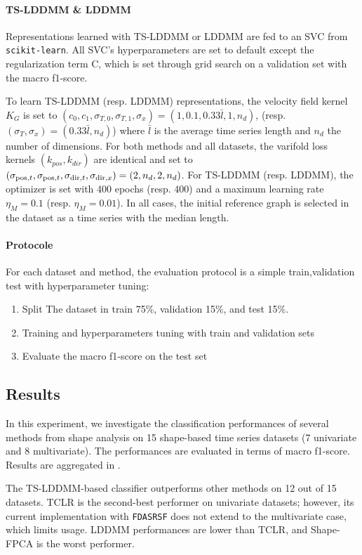 \paragraph{TS-LDDMM \& LDDMM}
Representations learned with TS-LDDMM or LDDMM are fed to an SVC from \texttt{scikit-learn}. All SVC's hyperparameters are set to default except the regularization term C, which is set through grid search on a validation set with the macro f1-score. 

To learn TS-LDDMM (resp. LDDMM) representations, the velocity field kernel $K_G$ is set to $ (c_0,c_1,\sigma_{T,0},\sigma_{T,1},\sigma_x) = (1,0.1,0.33\bar{l},1,n_d)$, (resp. $ (\sigma_{T},\sigma_x) = (0.33\bar{l},n_d)$) where $\bar{l}$ is the average time series length and $n_d$ the number of dimensions. For both methods and all datasets, the varifold loss kernels $(k_{pos},k_{dir})$ are identical and set to $(\sigma_{\mathrm{pos},t}, \sigma_{\mathrm{pos},t}, \sigma_{\mathrm{dir},t}, \sigma_{\mathrm{dir},x}) = (2,n_d,2,n_d)$. For TS-LDDMM (resp. LDDMM), the optimizer is set with 400 epochs (resp. 400) and a maximum learning rate $\eta_M = 0.1$ (resp. $\eta_M = 0.01$). In all cases, the initial reference graph is selected in the dataset as a time series with the median length.


\paragraph{Protocole}
For each dataset and method, the evaluation protocol is a simple train,validation test with hyperparameter tuning:
\begin{enumerate}
  \item Split The dataset in train 75\%, validation 15\%, and test 15\%.
  \item Training and hyperparameters tuning with train and validation sets
  \item Evaluate the macro f1-score on the test set 
\end{enumerate}


\subsection{Results}
In this experiment, we investigate the classification performances of several methods from shape analysis on 15 shape-based time series datasets (7 univariate and 8 multivariate). The performances are evaluated in terms of macro f1-score. Results are aggregated in . 

The TS-LDDMM-based classifier outperforms other methods on 12 out of 15 datasets. TCLR is the second-best performer on univariate datasets; however, its current implementation with \texttt{FDASRSF} does not extend to the multivariate case, which limits usage. LDDMM performances are lower than TCLR, and Shape-FPCA is the worst performer. 

